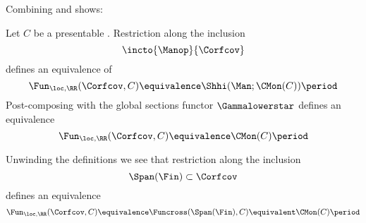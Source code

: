 \noindent Combining  and  shows:

\begin{corollary}\label{cor:transferconjecturehi}
	Let $ C $ be a presentable \category.
	Restriction along the inclusion
	\begin{equation*}
		\incto{\Manop}{\Corfcov}
	\end{equation*}
	defines an equivalence of \categories 
	\begin{equation*}
		\Fun_{\loc,\RR}(\Corfcov,C) \equivalence \Shhi(\Man;\CMon(C)) \period
	\end{equation*}
	Post-composing with the global sections functor $ \Gammalowerstar $ defines an equivalence
	\begin{equation*}
		\Fun_{\loc,\RR}(\Corfcov,C) \equivalence \CMon(C) \period
	\end{equation*} 
\end{corollary}

\begin{nul}
	Unwinding the definitions we see that restriction along the inclusion
	\begin{equation*}
		\Span(\Fin) \subset \Corfcov
	\end{equation*}
	defines an equivalence
	\begin{equation*}
		\Fun_{\loc,\RR}(\Corfcov,C) \equivalence \Funcross(\Span(\Fin),C) \equivalent \CMon(C) \period
	\end{equation*}
\end{nul}
